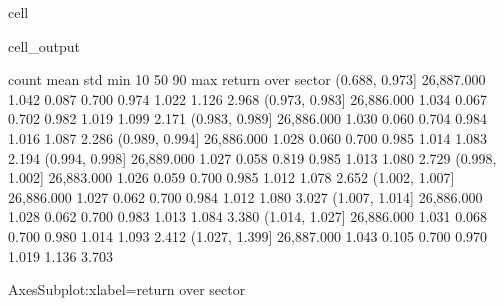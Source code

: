 \documentclass[letterpaper,10pt,english]{jupyterBook}
\begin{document}
\begin{sphinxuseclass}{cell}
\begin{sphinxVerbatimOutput}
\begin{sphinxuseclass}{cell_output}
\begin{sphinxVerbatim}[commandchars=\\\{\}]
                        count  mean   std   min   10\PYGZpc{}   50\PYGZpc{}   90\PYGZpc{}   max
return over sector                                                     
(0.688, 0.973]     26,887.000 1.042 0.087 0.700 0.974 1.022 1.126 2.968
(0.973, 0.983]     26,886.000 1.034 0.067 0.702 0.982 1.019 1.099 2.171
(0.983, 0.989]     26,886.000 1.030 0.060 0.704 0.984 1.016 1.087 2.286
(0.989, 0.994]     26,886.000 1.028 0.060 0.700 0.985 1.014 1.083 2.194
(0.994, 0.998]     26,889.000 1.027 0.058 0.819 0.985 1.013 1.080 2.729
(0.998, 1.002]     26,883.000 1.026 0.059 0.700 0.985 1.012 1.078 2.652
(1.002, 1.007]     26,886.000 1.027 0.062 0.700 0.984 1.012 1.080 3.027
(1.007, 1.014]     26,886.000 1.028 0.062 0.700 0.983 1.013 1.084 3.380
(1.014, 1.027]     26,886.000 1.031 0.068 0.700 0.980 1.014 1.093 2.412
(1.027, 1.399]     26,887.000 1.043 0.105 0.700 0.970 1.019 1.136 3.703
\end{sphinxVerbatim}

\begin{sphinxVerbatim}[commandchars=\\\{\}]
\PYGZlt{}AxesSubplot:xlabel=\PYGZsq{}return over sector\PYGZsq{}\PYGZgt{}
\end{sphinxVerbatim}

\noindent{}

\end{sphinxuseclass}\end{sphinxVerbatimOutput}

\end{sphinxuseclass}






\renewcommand{\indexname}{Index}
\printindex
\end{document}
